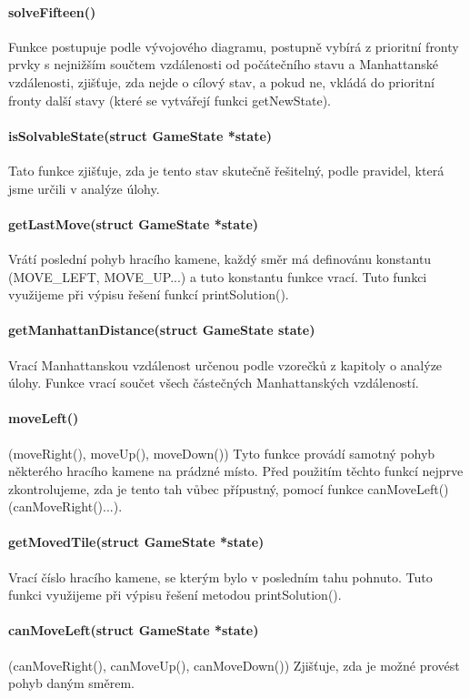 \documentclass[12pt,titlepage]{article}
\begin{document}
\paragraph{solveFifteen()}
Funkce postupuje podle vývojového diagramu, postupně vybírá z prioritní fronty prvky s nejnižším součtem vzdálenosti od počátečního stavu a Manhattanské vzdálenosti, zjišťuje, zda nejde o cílový stav, a pokud ne, vkládá do prioritní fronty další stavy (které se vytvářejí funkci getNewState).
\paragraph{isSolvableState(struct GameState *state)}
Tato funkce zjišťuje, zda je tento stav skutečně řešitelný, podle pravidel, která jsme určili v analýze úlohy.
\paragraph{getLastMove(struct GameState *state)}
Vrátí poslední pohyb hracího kamene, každý směr má definovánu konstantu (MOVE\_LEFT, MOVE\_UP...) a tuto konstantu funkce vrací. Tuto funkci využijeme při výpisu řešení funkcí printSolution().
\paragraph{getManhattanDistance(struct GameState state)}
Vrací Manhattanskou vzdálenost určenou podle vzorečků z kapitoly o analýze úlohy. Funkce vrací součet všech částečných Manhattanských vzdáleností.
\paragraph{moveLeft()}
(moveRight(), moveUp(), moveDown()) Tyto funkce provádí samotný pohyb některého hracího kamene na prádzné místo. Před použitím těchto funkcí nejprve zkontrolujeme, zda je tento tah vůbec přípustný, pomocí funkce canMoveLeft() (canMoveRight()...).
\paragraph{getMovedTile(struct GameState *state)}
Vrací číslo hracího kamene, se kterým bylo v posledním tahu pohnuto. Tuto funkci využijeme při výpisu řešení metodou printSolution().
\paragraph{canMoveLeft(struct GameState *state)}
(canMoveRight(), canMoveUp(), canMoveDown()) Zjišťuje, zda je možné provést pohyb daným směrem.
\end{document}
